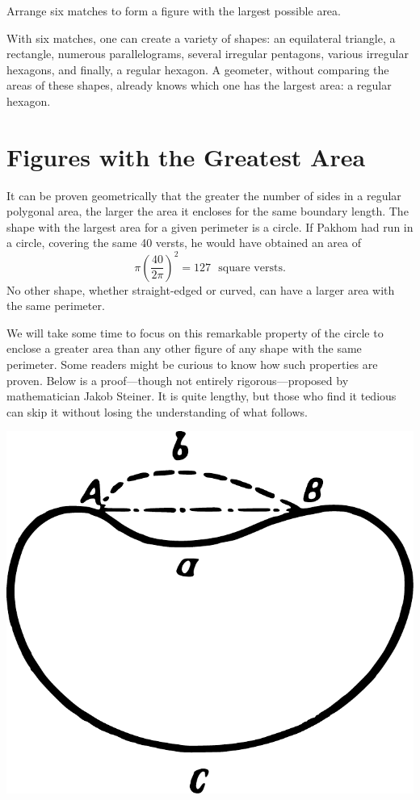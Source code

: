 \ques Arrange six matches to form a figure with the largest possible area.


\ans With six matches, one can create a variety of shapes: an equilateral triangle, a rectangle, numerous parallelograms, several irregular pentagons, various irregular hexagons, and finally, a regular hexagon. A geometer, without comparing the areas of these shapes, already knows which one has the largest area: a regular hexagon.


\section{Figures with the Greatest Area}
\label{sec-12.6}

It can be proven geometrically that the greater the number of sides in a regular polygonal area, the larger the area it encloses for the same boundary length. The shape with the largest area for a given perimeter is a circle. If Pakhom had run in a circle, covering the same 40 versts, he would have obtained an area of
\begin{equation*}%
 \pi \left( \frac{40}{2\pi} \right)^{2} = 127 \,\, \text{ square versts}. \end{equation*}
No other shape, whether straight-edged or curved, can have a larger area with the same perimeter.

We will take some time to focus on this remarkable property of the circle to enclose a greater area than any other figure of any shape with the same perimeter. Some readers might be curious to know how such properties are proven. Below is a proof—though not entirely rigorous—proposed by mathematician Jakob Steiner. It is quite lengthy, but those who find it tedious can skip it without losing the understanding of what follows.

\begin{marginfigure}[-3cm]%
\centering
\includegraphics[width=\textwidth]{figures/ch-12/fig-177.pdf}
\end{marginfigure}

